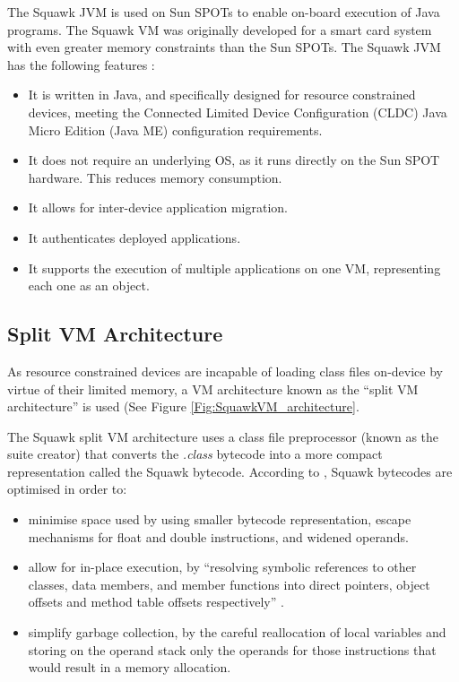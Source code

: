 The Squawk JVM is used on Sun SPOTs to enable on-board execution of Java
programs. The Squawk VM was originally developed for a smart card system with
even greater memory constraints than the Sun SPOTs. The Squawk JVM has the
following features \cite{simon_squawk:2006}:

\begin{itemize}
  \item It is written in Java, and specifically designed for resource
  constrained devices, meeting the Connected Limited Device Configuration
  (CLDC) Java Micro Edition (Java ME) configuration requirements.
  \item It does not require an underlying OS, as it runs directly on the Sun
  SPOT hardware. This reduces memory consumption.
  \item It allows for inter-device application migration.
  \item It authenticates deployed applications.
  \item It supports the execution of multiple applications on one VM,
  representing each one as an object.
\end{itemize}

\subsection{Split VM Architecture}

As resource constrained devices are incapable of loading class files on-device
by virtue of their limited memory, a VM architecture known as the ``split VM
architecture'' is used (See Figure \ref{Fig:SquawkVM_architecture}. 

The Squawk split VM architecture uses a class file preprocessor (known as the
suite creator) that converts the \emph{.class} bytecode into a more compact
representation called the Squawk bytecode. According to
\cite{simon_squawk:2006}, Squawk bytecodes are optimised in order to:
\begin{itemize}
\item minimise space used by using smaller bytecode representation, escape
mechanisms for float and double instructions, and widened operands. 
\item allow for in-place execution, by ``resolving symbolic references to other
classes, data members, and member functions into direct pointers, object offsets
and method table offsets respectively'' \cite{simon_squawk:2006}.
\item simplify garbage collection, by the careful reallocation of local
variables and storing on the operand stack only the operands for those
instructions that would result in a memory allocation.
\end{itemize}

